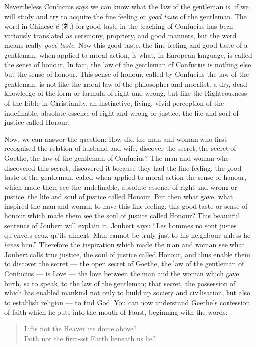 Nevertheless Confucius says we can know what the law of the gentleman is, if we will study and try to acquire the fine feeling or \emph{good taste} of the gentleman.
The word in Chinese \emph{li} (礼) for good taste in the teaching of Confucius has been variously translated as ceremony, propriety, and good manners, but the word means really \emph{good taste}.
Now this good taste, the fine feeling and good taste of a gentleman, when applied to moral action, is what, in European language, is called the sense of honour.
In fact, the law of the gentleman of Confucius is nothing else but the sense of honour.
This sense of honour, called by Confucius the law of the gentleman, is not like the moral law of the philosopher and moralist, a dry, dead knowledge of the form or formula of right and wrong, but like the Righteousness of the Bible in Christianity, an instinctive, living, vivid perception of the indefinable, absolute essence of right and wrong or justice, the life and soul of justice called Honour.

Now, we can answer the question: How did the man and woman who first recognised the relation of husband and wife, discover the secret, the secret of Goethe, the law of the gentleman of Confucius?
The man and woman who discovered this secret, discovered it because they had the fine feeling, the good taste of the gentleman, called when applied to moral action the sense of honour, which made them see the undefinable, absolute essence of right and wrong or justice, the life and soul of justice called Honour.
But then what gave, what inspired the man and woman to have this fine feeling, this good taste or sense of honour which made them see the soul of justice called Honour?
This beautiful sentence of Joubert  will explain it.
Joubert says: ``Les hommes no sont justes qu'envers ceux qu'ils aiment. Man cannot be truly just to his neighbour unless he \emph{loves} him.''
Therefore the inspiration which made the man and woman see what Joubert calls true justice, the soul of justice called Honour, and thus enable them to discover the secret --- the open secret of Goethe, the law of the gentleman of Confucius --- is Love --- the love between the man and the woman which gave birth, so to speak, to the law of the gentleman; that secret, the possession of which has enabled mankind not only to build up society and civilisation, but also to establish religion --- to find God.
You can now understand Goethe's confession of faith which he puts into the mouth of Faust,  beginning with the words:
\begin{quote}\footnotesize
    Lifts not the Heaven its dome above? \\
    Doth not the firm-set Earth beneath us lie?
\end{quote}

